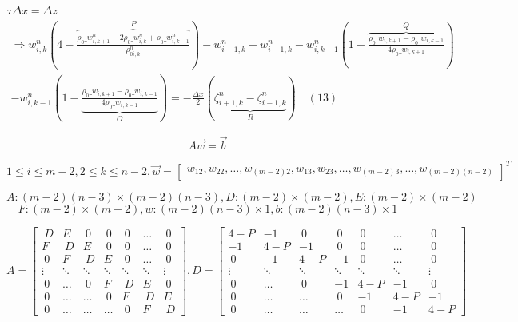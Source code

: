 \documentclass[a4paper,fleqn,10pt]{report}
\begin{document}
\begin{CJK*}{UTF8}{bsmi}
\quad $\because \Delta x = \Delta z$ \\
\begin{eqnarray*}
\Rightarrow w^{n}_{i,k}(4 - \overbrace{\frac{\rho_{0}\_w^{n}_{i,k+1} - 2\rho_{0}\_w^{n}_{i,k} + \rho_{0}\_w^{n}_{i,k-1}}{\rho^{n}_{0i,k}}}^{P}) -w^{n}_{i+1,k} - w^{n}_{i-1,k} - w^{n}_{i,k+1}(1 + \overbrace{\frac{\rho_0\_w_{i,k+1} - \rho_0\_w_{i,k-1}}{4\rho_0\_w_{i,k+1}}}^{Q}) \\ - w^{n}_{i,k-1}(1 - \underbrace{\frac{\rho_0\_w_{i,k+1} - \rho_0\_w_{i,k-1}}{4\rho_0\_w_{i,k-1}}}_{O}) = -\frac{\Delta x}{2}(\underbrace{\zeta^{n}_{i+1,k} - \zeta^{n}_{i-1,k}}_{R}) \quad (13)
\end{eqnarray*}

\begin{equation*}
A\vec{w} = \vec{b}
\end{equation*}

\begin{equation*}
1 \leq i \leq m-2, 2 \leq k \leq n-2, \vec{w} = 
\begin{bmatrix} 
	w_{12} , w_{22} , \ldots , w_{(m-2)2} , w_{13} , w_{23} , \ldots , w_{(m-2)3} , \ldots , w_{(m-2)(n-2)}
\end{bmatrix}^T
\end{equation*}

\begin{equation*}
A: (m-2)(n-3) \times (m-2)(n-3), D: (m-2) \times (m-2), E: (m-2) \times (m-2)
\end{equation*}
\begin{equation*}
F: (m-2) \times (m-2), w: (m-2)(n-3) \times 1, b: (m-2)(n-3) \times 1
\end{equation*}

\begin{equation*}
A =
\begin{bmatrix}
        ~D & E & ~0 & ~0 & ~0 & \ldots & ~0 \\
        F & ~D & E & ~0 & ~0 & \ldots & ~0 \\
        ~0 & F & ~D & E & ~0 & \ldots & ~0 \\
        \vdots & \ddots & \ddots & \ddots & \ddots & \ddots & \vdots \\
        ~0 & \ldots & ~0 & F & ~D & E & ~0 \\
        ~0 & \ldots & \ldots & ~0 & F & ~D & E \\
        ~0 & \ldots & \ldots & \ldots & ~0 & F & ~D
\end{bmatrix}, 
D = 
\begin{bmatrix}
	4-P & -1 & ~0 & ~0 & ~0 & \ldots & ~0 \\
        -1 & 4-P & -1 & ~0 & ~0 & \ldots & ~0 \\
        ~0 & -1 & 4-P & -1 & ~0 & \ldots & ~0 \\
        \vdots & \ddots & \ddots & \ddots & \ddots & \ddots & \vdots \\
        ~0 & \ldots & ~0 & -1 & 4-P & -1 & ~0 \\
        ~0 & \ldots & \ldots & ~0 & -1 & 4-P & -1 \\
        ~0 & \ldots & \ldots & \ldots & ~0 & -1 & 4-P


\end{bmatrix}
\end{equation*}
\end{CJK*}
\end{document}

